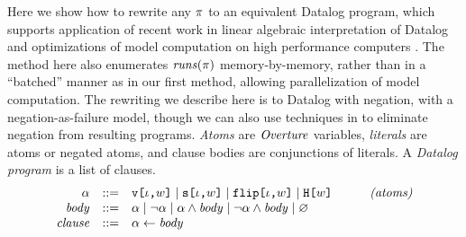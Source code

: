 Here we show how to rewrite any $\pi$ to an equivalent Datalog
program, which supports application of recent work in linear algebraic
interpretation of Datalog and optimizations of model computation on
high performance computers \cite{sakama2017linear}. The method here also enumerates
$\mathit{runs}(\pi)$ memory-by-memory, rather than in a ``batched'' manner
as in our first method, allowing parallelization of model
computation. The rewriting we describe here is to Datalog with
negation, with a negation-as-failure model, though we can also
use techniques in \cite{sakama2017linear} to eliminate negation from
resulting programs. \emph{Atoms} are $\mathit{Overture}$ variables, \emph{literals}
are atoms or negated atoms, and clause bodies are conjunctions of literals.
A \emph{Datalog program} is a list of clauses.
$$
\begin{array}{rclr}
  \alpha &::=& \texttt{v[}\iota\texttt{,}w\texttt{]} \mid  \texttt{s[}\iota\texttt{,}w\texttt{]} \mid \texttt{flip[}\iota\texttt{,}w\texttt{]} \mid \texttt{H[}w\texttt{]} & \qquad \textit{(atoms)}\\
  \mathit{body} &::=&  \alpha \mid \neg \alpha \mid \alpha \wedge \mathit{body} \mid \neg\alpha \wedge \mathit{body} \mid \varnothing \\
  \mathit{clause} &::=& \alpha \gets \mathit{body}
\end{array}
$$

